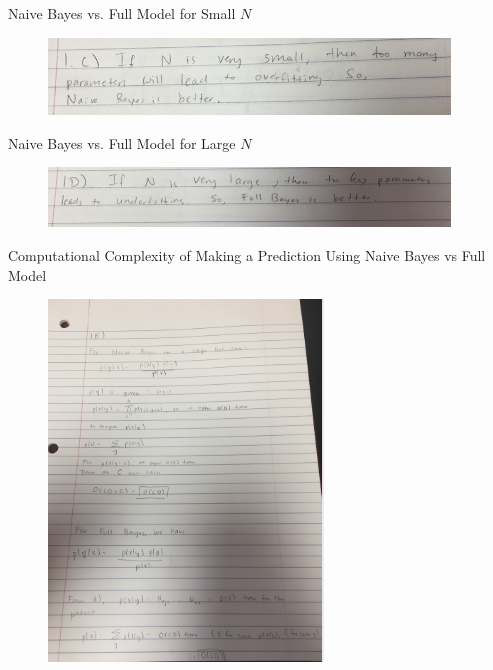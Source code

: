 \problem[2] Naive Bayes vs. Full Model for Small $N$
\begin{subsolution}
\begin{figure}[H]
	\centering
	\includegraphics[width=0.95\textwidth]{img/set6template-2bc0bc78.png}
	\caption{}
	\label{}
\end{figure}
\end{subsolution}
\clearpage

\problem[2] Naive Bayes vs. Full Model for Large $N$
\begin{subsolution}
\begin{figure}[H]
	\centering
	\includegraphics[width=0.95\textwidth]{img/set6template-fae955f2.png}
	\caption{}
	\label{}
\end{figure}
\end{subsolution}
\clearpage

\problem[11] Computational Complexity of Making a Prediction Using Naive Bayes vs Full Model
\begin{subsolution}
\begin{figure}[H]
	\centering
	\includegraphics[width=0.65\textwidth]{img/set6template-1d71be37.png}
	\caption{}
	\label{}
\end{figure}
\end{subsolution}
\clearpage


